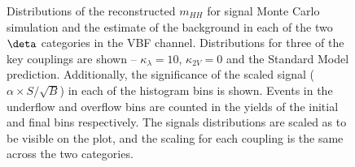 \begin{figure}[h!]
	\centering
	\caption{Distributions of the reconstructed $m_{HH}$ for signal Monte Carlo simulation and the estimate of the background in each of the two $\deta$ categories in the VBF channel. Distributions for three of the key couplings are shown -- $\kappa_{\lambda} = 10$, $\kappa_{2V} = 0$ and the Standard Model prediction. Additionally, the significance of the scaled signal ($\alpha \times S/\sqrt{B}$) in each of the histogram bins is shown. Events in the underflow and overflow bins are counted in the yields of the initial and final bins respectively. The signals distributions are scaled as to be visible on the plot, and the scaling for each coupling is the same across the two categories.}
	\label{fig:vbf-mhh-same}
\end{figure}

\FloatBarrier
\clearpage

